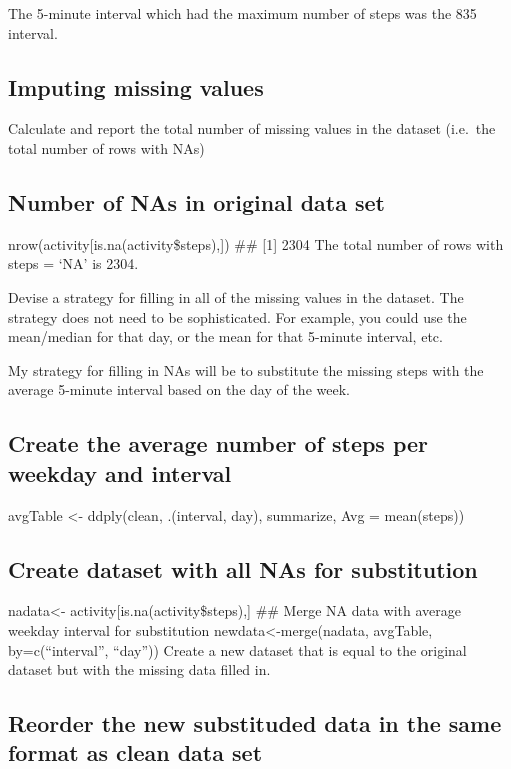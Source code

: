 \documentclass[]{article}
\begin{document}
The 5-minute interval which had the maximum number of steps was the 835
interval.

\subsection{Imputing missing values}\label{imputing-missing-values}

Calculate and report the total number of missing values in the dataset
(i.e.~the total number of rows with NAs)

\subsection{Number of NAs in original data
set}\label{number-of-nas-in-original-data-set}

nrow(activity{[}is.na(activity\$steps),{]}) \#\# {[}1{]} 2304 The total
number of rows with steps = `NA' is 2304.

Devise a strategy for filling in all of the missing values in the
dataset. The strategy does not need to be sophisticated. For example,
you could use the mean/median for that day, or the mean for that
5-minute interval, etc.

My strategy for filling in NAs will be to substitute the missing steps
with the average 5-minute interval based on the day of the week.

\subsection{Create the average number of steps per weekday and
interval}\label{create-the-average-number-of-steps-per-weekday-and-interval}

avgTable \textless{}- ddply(clean, .(interval, day), summarize, Avg =
mean(steps))

\subsection{Create dataset with all NAs for
substitution}\label{create-dataset-with-all-nas-for-substitution}

nadata\textless{}- activity{[}is.na(activity\$steps),{]} \#\# Merge NA
data with average weekday interval for substitution
newdata\textless{}-merge(nadata, avgTable, by=c(``interval'', ``day''))
Create a new dataset that is equal to the original dataset but with the
missing data filled in.

\subsection{Reorder the new substituded data in the same format as clean
data
set}\label{reorder-the-new-substituded-data-in-the-same-format-as-clean-data-set}
\end{document}
